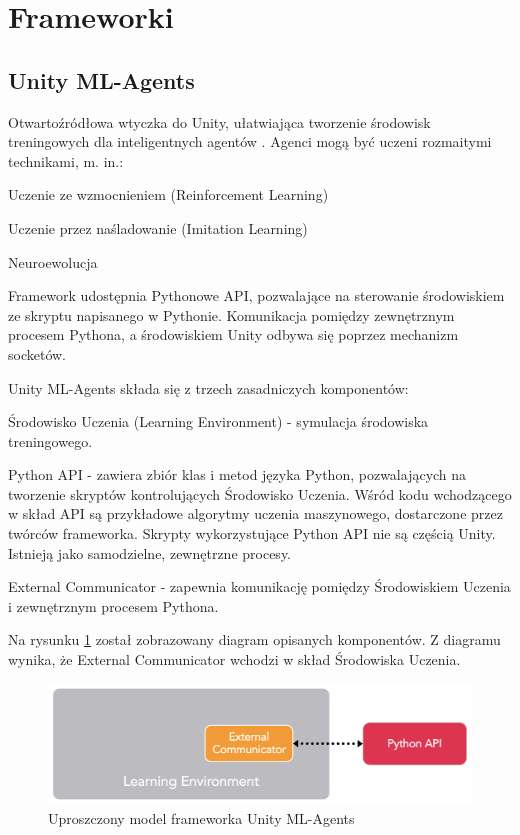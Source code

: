 \section{Frameworki}
\subsection{Unity ML-Agents}
Otwartoźródłowa wtyczka do Unity, ułatwiająca tworzenie środowisk treningowych dla inteligentnych agentów \cite{unitymla:overview}. Agenci mogą być uczeni rozmaitymi technikami, m. in.:
\begin{itemize*}
\item Uczenie ze wzmocnieniem (Reinforcement Learning)
\item Uczenie przez naśladowanie (Imitation Learning)
\item Neuroewolucja
\end{itemize*}
Framework udostępnia Pythonowe API, pozwalające na sterowanie środowiskiem ze skryptu napisanego w Pythonie. Komunikacja pomiędzy zewnętrznym procesem Pythona, a środowiskiem Unity odbywa się poprzez mechanizm socketów.

Unity ML-Agents składa się z trzech zasadniczych komponentów:
\begin{enumerate*}
\item Środowisko Uczenia (Learning Environment) - symulacja środowiska treningowego.
\item Python API - zawiera zbiór klas i metod języka Python, pozwalających na tworzenie skryptów kontrolujących Środowisko Uczenia. Wśród kodu wchodzącego w skład API są przykładowe algorytmy uczenia maszynowego, dostarczone przez twórców frameworka. Skrypty wykorzystujące Python API nie są częścią Unity. Istnieją jako samodzielne, zewnętrzne procesy.
\item External Communicator - zapewnia komunikację pomiędzy Środowiskiem Uczenia i zewnętrznym procesem Pythona.
\end{enumerate*}
Na rysunku \ref{UnityMlaBasicModel} został zobrazowany diagram opisanych komponentów.
Z diagramu wynika, że External Communicator wchodzi w skład Środowiska Uczenia.

\begin{figure}[h]
\begin{center}
\includegraphics[width=15cm]{resources/figures/unitymla_basic_architecture.png}
\caption{Uproszczony model frameworka Unity ML-Agents}
\label{UnityMlaBasicModel}
\end{center}
\end{figure}

